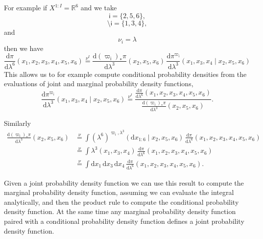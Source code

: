 \documentclass[11pt, oneside]{article}
\newcommand{\rnd}[2]{
  \ensuremath{ \frac{ \mathrm{d} #1}{ \mathrm{d} #2 } }
}
\begin{document}
For example if $X^{1:I} = \mathbb{R}^{6}$ and we take
%
\begin{equation*}
\mathsf{i} = \{ 2, 5, 6 \},
\end{equation*}
%
\begin{equation*}
\setminus \mathsf{i} = \{ 1, 3, 4 \},
\end{equation*}
%
and
%
\begin{equation*}
\nu_{i} = \lambda
\end{equation*}
%
then we have
%
\begin{equation*}
\rnd{\pi}{ \lambda^{6} }( x_{1}, x_{2}, x_{3}, x_{4}, x_{5}, x_{6} )
\overset{ \nu^{I} }{ = }
\rnd{ (\varpi_{\mathsf{i}})_{*} \pi }{ \lambda^{3} } ( x_{2}, x_{5}, x_{6}  ) \,
\rnd{ \pi^{\varpi_{\mathsf{i}}} }{ \lambda^{3} } (x_{1}, x_{3}, x_{4} \mid x_{2}, x_{5}, x_{6} )
\end{equation*}
%
This allows us to for example compute conditional probability densities from the evaluations of 
joint and marginal probability density functions,
%
\begin{equation*}
\rnd{ \pi^{\varpi_{\mathsf{i}}} }{ \lambda^{3} } (x_{1}, x_{3}, x_{4} \mid x_{2}, x_{5}, x_{6} )
\overset{ \nu^{I} }{ = }
\frac{ \rnd{\pi}{ \lambda^{6} }( x_{1}, x_{2}, x_{3}, x_{4}, x_{5}, x_{6} ) }
{ \rnd{ (\varpi_{\mathsf{i}})_{*} \pi }{ \lambda^{3} } ( x_{2}, x_{5}, x_{6} ) }.
\end{equation*}


Similarly
%
\begin{align*}
\rnd{ (\varpi_{\mathsf{i}})_{*}\pi }{ \lambda^{3} }( x_{2}, x_{5}, x_{6}  ) 
&\overset{\nu}{=}
\int (\lambda^{6})^{\varpi_{\mathsf{i}}, \lambda^{3}}( \mathrm{d} x_{1:6} \mid x_{2}, x_{5}, x_{6} ) \, 
\rnd{\pi}{\lambda^{6}}( x_{1}, x_{2}, x_{3}, x_{4}, x_{5}, x_{6} )
\\
&\overset{\nu}{=}
\int \lambda^{3}(x_{1}, x_{3}, x_{4} ) \, 
\rnd{\pi}{\lambda^{6}}( x_{1}, x_{2}, x_{3}, x_{4}, x_{5}, x_{6} )
\\
&\overset{\nu}{=}
\int \mathrm{d} x_{1} \, \mathrm{d} x_{3} \, \mathrm{d} x_{4} \,
\rnd{\pi}{\lambda^{6}}( x_{1}, x_{2}, x_{3}, x_{4}, x_{5}, x_{6} ).
\end{align*}

Given a joint probability density function we can use this result to compute the marginal 
probability density function, assuming we can evaluate the integral analytically, and then 
the product rule to compute the conditional probability density function.  At the same time 
any marginal probability density function paired with a conditional probability density 
function defines a joint probability density function.
\end{document}
